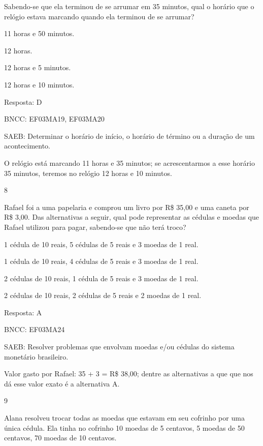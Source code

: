 \begin{escolha}
{\begin{escolha}
{Sabendo-se que ela terminou de se arrumar em 35 minutos, qual o horário
que o relógio estava marcando quando ela terminou de se arrumar?

\begin{escolha}

\item
  11 horas e 50 minutos.
\item
  12 horas.
\item
  12 horas e 5 minutos.
\item
  12 horas e 10 minutos.
\end{escolha}

Resposta: D

BNCC: EF03MA19, EF03MA20

SAEB: Determinar o horário de início, o horário de término ou a duração de um acontecimento.

O relógio está marcando 11 horas e 35 minutos; se acrescentarmos a esse horário 35 minutos, teremos no relógio 12 horas e 10 minutos.

\num{8}

Rafael foi a uma papelaria e comprou um livro por R\$ 35,00 e uma caneta
por R\$ 3,00. Das alternativas a seguir, qual pode representar as cédulas
e moedas que Rafael utilizou para pagar, sabendo-se que não terá troco?

\begin{escolha}

\item
  1 cédula de 10 reais, 5 cédulas de 5 reais e 3 moedas de 1 real.
\item
  1 cédula de 10 reais, 4 cédulas de 5 reais e 3 moedas de 1 real.
\item
  2 cédulas de 10 reais, 1 cédula de 5 reais e 3 moedas de 1 real.
\item
  2 cédulas de 10 reais, 2 cédulas de 5 reais e 2 moedas de 1 real.
\end{escolha}

Resposta: A

BNCC: EF03MA24

SAEB: Resolver problemas que envolvam moedas e/ou cédulas do
sistema monetário brasileiro.

Valor gasto por Rafael: 35 + 3 = R\$ 38,00; dentre as alternativas a que
que nos dá esse valor exato é a alternativa A.

\num{9}

Alana resolveu trocar todas as moedas que estavam em seu cofrinho por uma
única cédula. Ela tinha no cofrinho 10 moedas de 5 centavos, 5 moedas de
50 centavos, 70 moedas de 10 centavos.

}
\end{escolha}}
\end{escolha}
